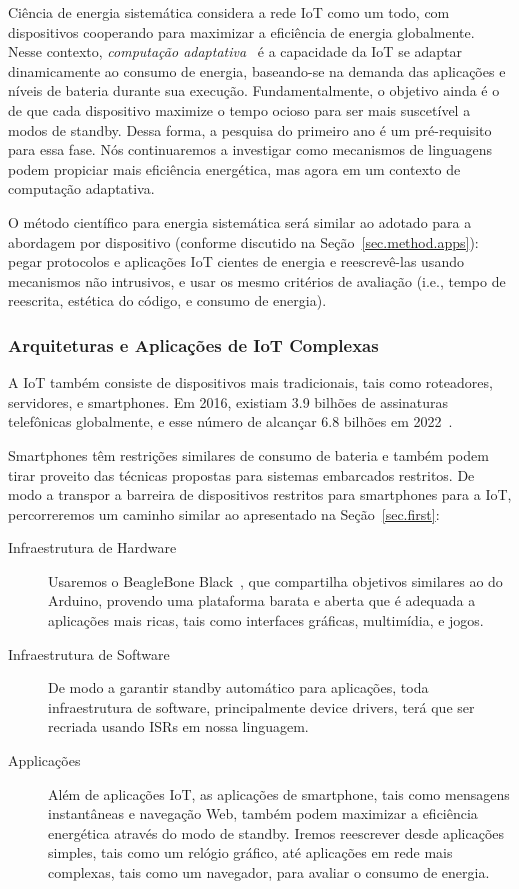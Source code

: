 \documentclass[12pt,english]{amsart}
\begin{document}
Ciência de energia sistemática considera a rede IoT como um todo, com
dispositivos cooperando para maximizar a eficiência de energia globalmente.
%
Nesse contexto, \emph{computação adaptativa}~\cite{adaptive} é a capacidade
da IoT se adaptar dinamicamente ao consumo de energia, baseando-se na demanda
das aplicações e níveis de bateria durante sua execução.
%
Fundamentalmente, o objetivo ainda é o de que cada dispositivo maximize o tempo
ocioso para ser mais suscetível a modos de standby.
Dessa forma, a pesquisa do primeiro ano é um pré-requisito para essa fase.
%
Nós continuaremos a investigar como mecanismos de linguagens podem propiciar
mais eficiência energética, mas agora em um contexto de computação adaptativa.

O método científico para energia sistemática será similar ao adotado para a
abordagem por dispositivo (conforme discutido na Seção~\ref{sec.method.apps}):
pegar protocolos e aplicações IoT cientes de energia e reescrevê-las usando
mecanismos não intrusivos, e usar os mesmo critérios de avaliação (i.e., tempo
de reescrita, estética do código, e consumo de energia).

\subsubsection{Arquiteturas e Aplicações de IoT Complexas}
\label{sec.method.complex}

A IoT também consiste de dispositivos mais tradicionais, tais como roteadores,
servidores, e smartphones.
%
Em 2016, existiam 3.9 bilhões de assinaturas telefônicas globalmente, e esse
número de alcançar 6.8 bilhões em 2022~\cite{ericsson.mobility}.

Smartphones têm restrições similares de consumo de bateria e também podem tirar
proveito das técnicas propostas para sistemas embarcados restritos.
%
De modo a transpor a barreira de dispositivos restritos para smartphones para a
IoT, percorreremos um caminho similar ao apresentado na Seção~\ref{sec.first}:
%
\begin{description}
\item[Infraestrutura de Hardware]
Usaremos o BeagleBone Black~\cite{bbb.manual}, que compartilha objetivos
similares ao do Arduino, provendo uma plataforma barata e aberta que é adequada
a aplicações mais ricas, tais como interfaces gráficas, multimídia, e jogos.
\item[Infraestrutura de Software]
De modo a garantir standby automático para aplicações, toda infraestrutura de
software, principalmente device drivers, terá que ser recriada usando ISRs em
nossa linguagem.
\item[Applicações]
Além de aplicações IoT, as aplicações de smartphone, tais como mensagens
instantâneas e navegação Web, também podem maximizar a eficiência energética
através do modo de standby.
Iremos reescrever desde aplicações simples, tais como um relógio gráfico, até
aplicações em rede mais complexas, tais como um navegador, para avaliar o
consumo de energia.
\end{description}
\end{document}
